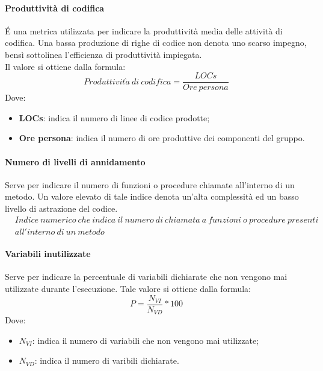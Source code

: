 \documentclass[../NormeDiProgetto.tex]{subfiles}
\begin{document}
			\paragraph{Produttività di codifica}
				É una metrica utilizzata per indicare la produttività media delle attività di codifica. Una bassa produzione di righe di codice non denota uno scarso impegno, bensì sottolinea l'efficienza di produttività impiegata. \\Il valore si ottiene dalla formula:
				\begin{equation*}
					Produttivit\grave{a} \ di \ codifica = \frac{LOCs}{Ore \ persona}
				\end{equation*}
				Dove:
				\begin{itemize}
					\item \textbf{LOCs}: indica il numero di linee di codice prodotte;
					\item \textbf{Ore persona}: indica il numero di ore produttive dei componenti del gruppo.
				\end{itemize}
			
			\paragraph{Numero di livelli di annidamento}
				Serve per indicare il numero di funzioni o procedure chiamate all'interno di un metodo. Un valore elevato di tale indice denota un'alta complessità ed un basso livello di astrazione del codice.
				\begin{equation*}
					\begin{split}
						&Indice \ numerico \ che \ indica \ il \ numero \ di \ chiamata \ a \ funzioni \ o \ procedure \ presenti \\ 								&all'interno \ di \ un \ metodo
					\end{split}
				\end{equation*}
			
			\paragraph{Variabili inutilizzate}
				Serve per indicare la percentuale di variabili dichiarate che non vengono mai utilizzate durante l'esecuzione.
				Tale valore si ottiene dalla formula:
				\begin{equation*}
					P = \frac{N_{VI}}{N_{VD}} * 100
				\end{equation*}
				Dove:
				\begin{itemize}
					\item \textbf{$N_{VI}$}: indica il numero di variabili che non vengono mai utilizzate;
					\item \textbf{$N_{VD}$}: indica il numero di varibili dichiarate.
				\end{itemize}
			
\end{document}
